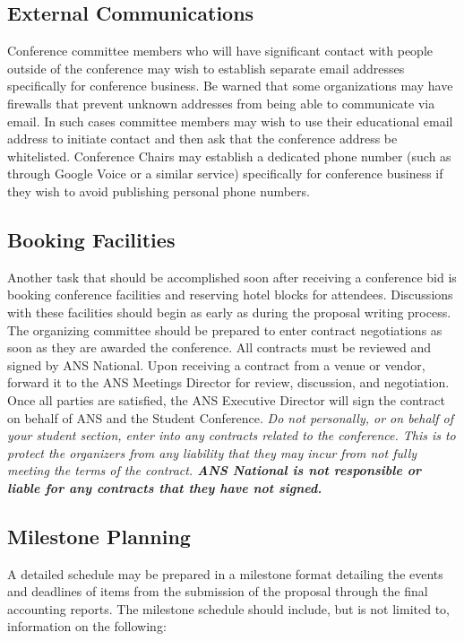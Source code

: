 \documentclass[12pt]{article}
\begin{document}
\subsection{External Communications}
Conference committee members who will have significant contact with people outside of the conference may wish to establish  separate email addresses specifically for conference business.
Be warned that some organizations may have firewalls that prevent unknown addresses from being able to communicate via email.
In such cases committee members may wish to use their educational email address to initiate contact and then ask that the conference address be whitelisted.
Conference Chairs may establish a dedicated phone number (such as through Google Voice or a similar service) specifically for conference business if they wish to avoid publishing personal phone numbers.

\subsection{Booking Facilities}

Another task that should be accomplished soon after receiving a conference bid is booking conference facilities and reserving hotel blocks for attendees.
Discussions with these facilities should begin as early as during the proposal writing process.
The organizing committee should be prepared to enter contract negotiations as soon as they are awarded the conference.
All contracts must be reviewed and signed by ANS National.
Upon receiving a contract from a venue or vendor, forward it to the ANS Meetings Director for review, discussion, and negotiation.
Once all parties are satisfied, the ANS Executive Director will sign the contract on behalf of ANS and the Student Conference.
\emph{Do not personally, or on behalf of your student section, enter into any contracts related to the conference.
This is to protect the organizers from any liability that they may incur from not fully meeting the terms of the contract.
\textbf{ANS National is not responsible or liable for any contracts that they have not signed.}}

\subsection{Milestone Planning}
A detailed schedule may be prepared in a milestone format detailing the events and deadlines of items from the submission of the proposal through the final accounting reports.
The milestone schedule should include, but is not limited to, information on the following:
\end{document}
